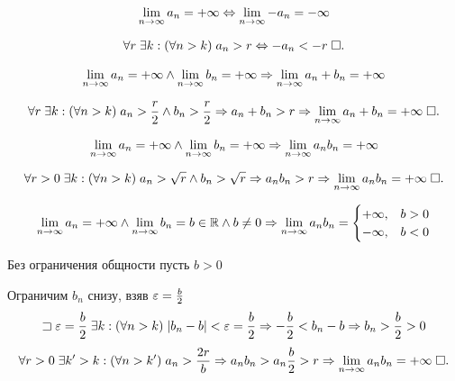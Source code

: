 \documentclass{article}
\begin{document}
\theorem
\begin{align*}
	\lim\limits_{n\to\infty} a_{n}=+\infty\Leftrightarrow \lim\limits_{n\to\infty} -a_{n}=-\infty
\end{align*}

\proof
\begin{align*}
	\forall r\;\exists k:(\forall n>k)\;a_{n}>r\Leftrightarrow -a_{n}<-r\;\square.
\end{align*}

\theorem
\begin{align*}
	\lim\limits_{n\to\infty} a_{n}=+\infty\land\lim\limits_{n\to\infty} b_{n}=+\infty\Rightarrow \lim\limits_{n\to\infty} a_{n}+b_{n}=+\infty
\end{align*}

\proof
\begin{align*}
	\forall r\;\exists k:(\forall n>k)\;a_{n}>\frac{r}{2}\land b_{n}>\frac{r}{2}\Rightarrow a_{n}+b_{n}>r\Rightarrow \lim\limits_{n\to\infty} a_{n}+b_{n}=+\infty\;\square.
\end{align*}

\theorem
\begin{align*}
	\lim\limits_{n\to\infty} a_{n}=+\infty\land\lim\limits_{n\to\infty} b_{n}=+\infty\Rightarrow \lim\limits_{n\to\infty} a_{n}b_{n}=+\infty
\end{align*}

\proof
\begin{align*}
	\forall r>0\;\exists k:(\forall n>k)\;a_{n}>\sqrt{r}\land b_{n}>\sqrt{r}\Rightarrow a_{n}b_{n}>r\Rightarrow \lim\limits_{n\to\infty} a_{n}b_{n}=+\infty\;\square.
\end{align*}

\theorem
\begin{align*}
	\lim\limits_{n\to\infty} a_{n}=+\infty\land \lim\limits_{n\to\infty} b_{n}=b\in\mathbb{R}\land b\neq 0\Rightarrow \lim\limits_{n\to\infty} a_{n}b_{n}=
	\begin{cases}
		+\infty, & b>0 \\
		-\infty, & b<0
	\end{cases}
\end{align*}

\proof

Без ограничения общности пусть $b>0$

Ограничим $b_{n}$ снизу, взяв $\varepsilon=\frac{b}{2}$
\begin{align*}
	\sqsupset\varepsilon=\frac{b}{2}\;\exists k:(\forall n>k)\;|b_{n}-b|<\varepsilon=\frac{b}{2}\Rightarrow -\frac{b}{2}<b_{n}-b\Rightarrow b_{n}>\frac{b}{2}>0
\end{align*}
\begin{align*}
	\forall r>0\;\exists k'>k:(\forall n>k')\;a_{n}>\frac{2r}{b}\Rightarrow a_{n}b_{n}>a_{n}\frac{b}{2}>r\Rightarrow\lim\limits_{n\to\infty} a_{n}b_{n}=+\infty\;\square.
\end{align*}
\end{document}
